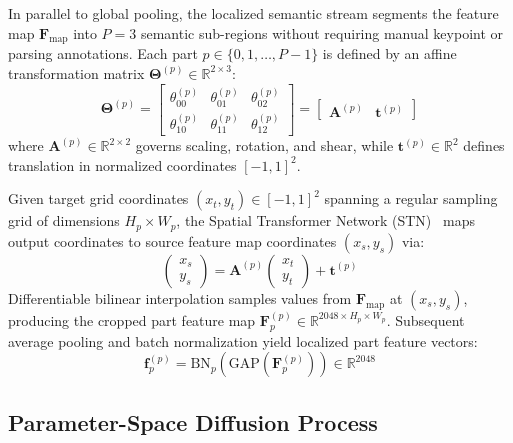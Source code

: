 In parallel to global pooling, the localized semantic stream segments the feature map $\mathbf{F}_{\text{map}}$ into $P = 3$ semantic sub-regions without requiring manual keypoint or parsing annotations. Each part $p \in \{0, 1, \dots, P-1\}$ is defined by an affine transformation matrix $\mathbf{\Theta}^{(p)} \in \mathbb{R}^{2 \times 3}$:
\begin{equation}
    \mathbf{\Theta}^{(p)} = \begin{bmatrix} \theta_{00}^{(p)} & \theta_{01}^{(p)} & \theta_{02}^{(p)} \\ \theta_{10}^{(p)} & \theta_{11}^{(p)} & \theta_{12}^{(p)} \end{bmatrix} = \begin{bmatrix} \mathbf{A}^{(p)} & \mathbf{t}^{(p)} \end{bmatrix}
\end{equation}
where $\mathbf{A}^{(p)} \in \mathbb{R}^{2 \times 2}$ governs scaling, rotation, and shear, while $\mathbf{t}^{(p)} \in \mathbb{R}^2$ defines translation in normalized coordinates $[-1, 1]^2$.

Given target grid coordinates $(x_t, y_t) \in [-1, 1]^2$ spanning a regular sampling grid of dimensions $H_p \times W_p$, the Spatial Transformer Network (STN)~\cite{jaderberg2015spatial} maps output coordinates to source feature map coordinates $(x_s, y_s)$ via:
\begin{equation}
    \begin{pmatrix} x_s \\ y_s \end{pmatrix} = \mathbf{A}^{(p)} \begin{pmatrix} x_t \\ y_t \end{pmatrix} + \mathbf{t}^{(p)}
\end{equation}
Differentiable bilinear interpolation samples values from $\mathbf{F}_{\text{map}}$ at $(x_s, y_s)$, producing the cropped part feature map $\mathbf{F}_p^{(p)} \in \mathbb{R}^{2048 \times H_p \times W_p}$. Subsequent average pooling and batch normalization yield localized part feature vectors:
\begin{equation}
    \mathbf{f}_p^{(p)} = \text{BN}_p\left(\text{GAP}(\mathbf{F}_p^{(p)})\right) \in \mathbb{R}^{2048}
\end{equation}

\subsection{Parameter-Space Diffusion Process}


